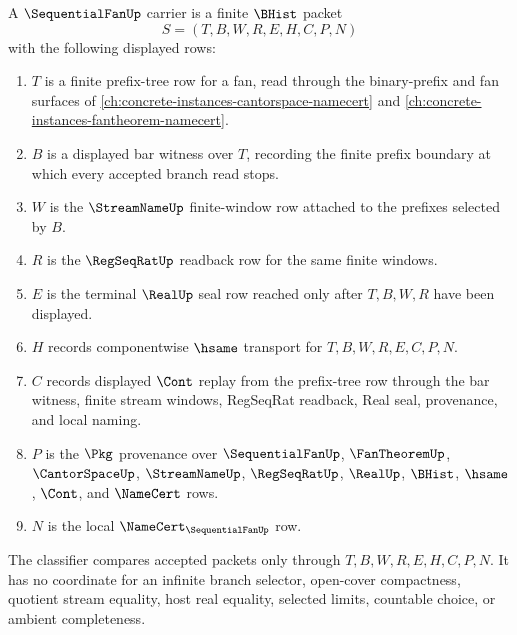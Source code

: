 \begin{definition}\label{def:sequential-fan-carrier}
A $\SequentialFanUp$ carrier is a finite $\BHist$ packet
$$
S=(T,B,W,R,E,H,C,P,N)
$$
with the following displayed rows:
\begin{enumerate}
\item $T$ is a finite prefix-tree row for a fan, read through the binary-prefix and fan surfaces of \autoref{ch:concrete-instances-cantorspace-namecert} and \autoref{ch:concrete-instances-fantheorem-namecert}.
\item $B$ is a displayed bar witness over $T$, recording the finite prefix boundary at which every accepted branch read stops.
\item $W$ is the $\StreamNameUp$ finite-window row attached to the prefixes selected by $B$.
\item $R$ is the $\RegSeqRatUp$ readback row for the same finite windows.
\item $E$ is the terminal $\RealUp$ seal row reached only after $T,B,W,R$ have been displayed.
\item $H$ records componentwise $\hsame$ transport for $T,B,W,R,E,C,P,N$.
\item $C$ records displayed $\Cont$ replay from the prefix-tree row through the bar witness, finite stream windows, RegSeqRat readback, Real seal, provenance, and local naming.
\item $P$ is the $\Pkg$ provenance over $\SequentialFanUp$, $\FanTheoremUp$, $\CantorSpaceUp$, $\StreamNameUp$, $\RegSeqRatUp$, $\RealUp$, $\BHist$, $\hsame$, $\Cont$, and $\NameCert$ rows.
\item $N$ is the local $\NameCert_{\SequentialFanUp}$ row.
\end{enumerate}
The classifier compares accepted packets only through $T,B,W,R,E,H,C,P,N$. It has no coordinate for an infinite branch selector, open-cover compactness, quotient stream equality, host real equality, selected limits, countable choice, or ambient completeness.
\end{definition}

